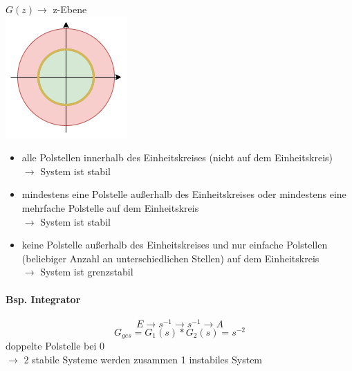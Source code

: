 \documentclass[a4paper]{article}
\begin{document}
\begin{paracol}{2}
$G(z) \rightarrow$ z-Ebene \\
\includegraphics[scale=0.8]{img/2024_11_20_z-Ebene.png}
\begin{itemize}
	\item alle Polstellen innerhalb des Einheitskreises (nicht auf dem Einheitskreis) \\
	$\rightarrow$ System ist stabil
	\item mindestens eine Polstelle außerhalb des Einheitskreises oder mindestens eine mehrfache Polstelle auf dem Einheitskreis \\
	$\rightarrow$ System ist stabil
	\item keine Polstelle außerhalb des Einheitskreises und nur einfache Polstellen (beliebiger Anzahl an unterschiedlichen Stellen) auf dem Einheitskreis \\
	$\rightarrow$ System ist grenzstabil
\end{itemize}
\paragraph{Bsp. Integrator}
\[
E \rightarrow s^{-1} \rightarrow s^{-1} \rightarrow A
\]
\[
G_{ges} = G_1(s) * G_2(s) = s^{-2}
\]
doppelte Polstelle bei 0 \\
$\rightarrow$ 2 stabile Systeme werden zusammen 1 instabiles System
\end{paracol}
\end{document}
